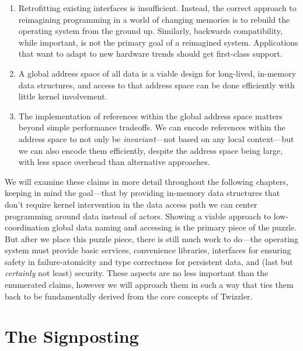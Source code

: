 \begin{enumerate}
    \item Retrofitting existing interfaces is insufficient. Instead, the correct approach to reimagining programming in
          a world of changing memories is to rebuild the operating system from the ground up.
          Similarly, backwards compatibility, while important, is not the primary goal of a reimagined system.
          Applications that want to adapt to new hardware trends should get first-class support.
    \item A global address space of all data is a viable design for long-lived, in-memory data structures, and access to
          that address space can be done efficiently with little kernel involvement.
    \item The implementation of references within the global address space matters beyond simple performance tradeoffs.
          We can
          encode references within the address space to not only be \emph{invariant}---\ie not based on any local
          context---but we can also encode them efficiently, despite the address space being large, with less space
          overhead than alternative approaches.
\end{enumerate}

We will examine these claims in more detail throughout the following chapters, keeping in mind the goal---that by
providing in-memory data structures that don't require kernel intervention in the data access path we can center
programming around data instead of actors. Showing a viable approach to low-coordination global data naming and
accessing is the primary piece of the puzzle. But after we place this puzzle piece, there is still much work to do---the
operating system must provide basic services, convenience libraries, interfaces for ensuring safety in
failure-atomicity and type correctness for persistent data, and (last but \emph{certainly} not least)
security. These
aspects are no less important than the enumerated claims, however we will approach them in such a way that ties
them back to be fundamentally derived from the core concepts of Twizzler.

\section*{The Signposting}


